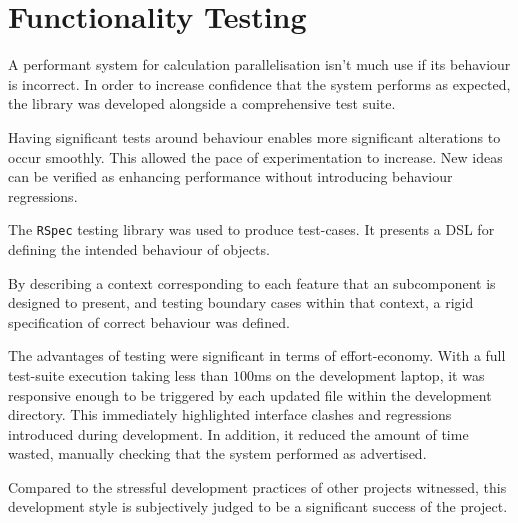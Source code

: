 \section{Functionality Testing}
A performant system for calculation parallelisation isn't much use if its behaviour is incorrect. In order to increase confidence that the system performs as expected, the library was developed alongside a comprehensive test suite.

Having significant tests around behaviour enables more significant alterations to occur smoothly. This allowed the pace of experimentation to increase. New ideas can be verified as enhancing performance without introducing behaviour regressions.

The \verb|RSpec|\cite{rspec} testing library was used to produce test-cases. It presents a \ac{DSL} for defining the intended behaviour of objects.

By describing a context corresponding to each feature that an subcomponent is designed to present, and testing boundary cases within that context, a rigid specification of correct behaviour was defined.

The advantages of testing were significant in terms of effort-economy. With a full test-suite execution taking less than $100$ms on the development laptop, it was responsive enough to be triggered by each updated file within the development directory. This immediately highlighted interface clashes and regressions introduced during development. In addition, it reduced the amount of time wasted, manually checking that the system performed as advertised.

Compared to the stressful development practices of other projects witnessed, this development style is subjectively judged to be a significant success of the project.

